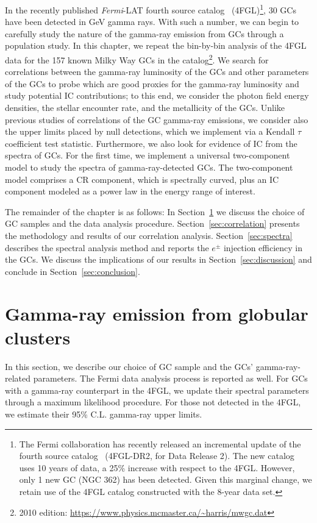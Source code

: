 \documentclass[doublespace,nopageskip]{VTthesis} %
\begin{document}
In the recently published \textit{Fermi}-LAT fourth source catalog~\citep{2020ApJS..247...33A} (4FGL)\footnote{The Fermi collaboration has recently released an incremental update of the fourth source catalog~\citep{2020arXiv200511208B} (4FGL-DR2, for Data Release 2). The new catalog uses 10 years of data, a 25\% increase with respect to the 4FGL. However, only 1 new GC (NGC 362) has been detected. Given this marginal change, we retain use of the 4FGL catalog constructed with the 8-year data set.}, 30 GCs have been detected in GeV gamma rays. With such a number, we can begin to carefully study the nature of the gamma-ray emission from GCs through a population study. In this chapter, we repeat the bin-by-bin analysis of the 4FGL data for the 157 known Milky Way GCs in the \citet{1996AJ....112.1487H} catalog\footnote{2010  edition: \url{https://www.physics.mcmaster.ca/~harris/mwgc.dat}}. We search for correlations between the gamma-ray luminosity of the GCs and other parameters of the GCs to probe which are good proxies for the gamma-ray luminosity and study potential IC contributions; to this end, we consider the photon field energy densities, the stellar encounter rate, and the metallicity of the GCs. Unlike previous studies of correlations of the GC gamma-ray emissions, we consider also the upper limits placed by null detections, which we implement via a Kendall $\tau$ coefficient test statistic. Furthermore, we also look for evidence of IC from the spectra of GCs. For the first time, we implement a universal two-component model to study the spectra of gamma-ray-detected GCs. The two-component model comprises a CR component, which is spectrally curved, plus an IC component modeled as a power law in the energy range of interest.

The remainder of the chapter is as follows: In Section~\ref{sec:gamma_GCs} we discuss the choice of GC samples and the data analysis procedure. Section~\ref{sec:correlation} presents the methodology and results of our correlation analysis. Section~\ref{sec:spectra} describes the spectral analysis method and reports the $e^\pm$ injection efficiency in the GCs. We discuss the implications of our results in Section~\ref{sec:discussion} and conclude in Section~\ref{sec:conclusion}.

\section{Gamma-ray emission from globular clusters}\label{sec:gamma_GCs}

In this section, we describe our choice of GC sample and the GCs' gamma-ray-related parameters. The Fermi data analysis process is reported as well. For GCs with a gamma-ray counterpart in the 4FGL, we update their spectral parameters through a maximum likelihood procedure. For those not detected in the 4FGL, we estimate their 95\% C.L. gamma-ray upper limits.
\end{document}
